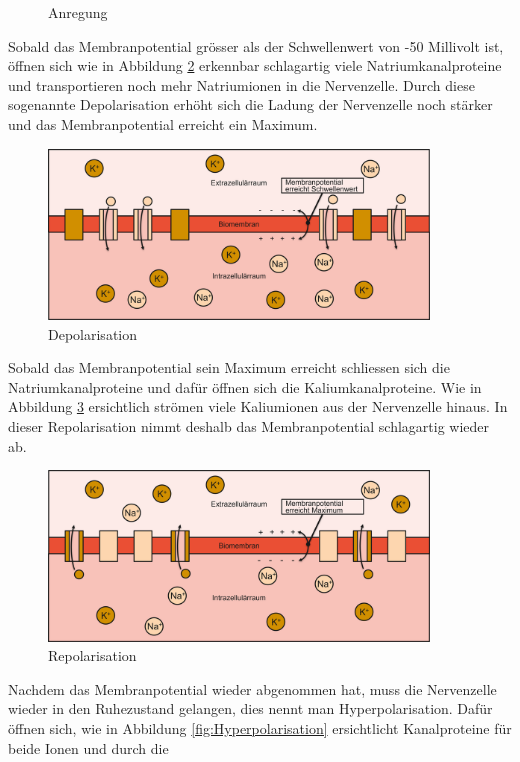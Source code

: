 \begin{refsection}
\begin{figure}[H]
    \caption{Anregung}
    \label{fig:Anregung}
\end{figure}
\noindent
Sobald das Membranpotential grösser als der Schwellenwert von -50 Millivolt ist, öffnen sich wie in Abbildung
\ref{fig:Depolarisation} erkennbar schlagartig viele
Natriumkanalproteine und transportieren noch mehr Natriumionen in die Nervenzelle.
Durch diese sogenannte Depolarisation erhöht sich die Ladung der Nervenzelle noch stärker und das Membranpotential erreicht ein Maximum. 
\begin{figure}[H]
    \centering
    \includegraphics[width=0.9\textwidth]{papers/nerven/Bilder/Vorgang3.png}
    \caption{Depolarisation}
    \label{fig:Depolarisation}
\end{figure}
\noindent
Sobald das Membranpotential sein Maximum erreicht schliessen sich die Natriumkanalproteine und dafür öffnen sich die
Kaliumkanalproteine.
Wie in Abbildung \ref{fig:Repolarisation} ersichtlich strömen viele Kaliumionen aus der Nervenzelle hinaus.
In dieser Repolarisation nimmt deshalb das Membranpotential schlagartig wieder ab.
\begin{figure}[H]
    \centering
    \includegraphics[width=0.9\textwidth]{papers/nerven/Bilder/Vorgang4.png}
    \caption{Repolarisation}
    \label{fig:Repolarisation}
\end{figure}
\noindent
Nachdem das Membranpotential wieder abgenommen hat, muss die Nervenzelle wieder in den Ruhezustand gelangen, dies nennt
man Hyperpolarisation.
Dafür öffnen sich, wie in Abbildung \ref{fig:Hyperpolarisation} ersichtlicht Kanalproteine für beide Ionen und durch die

\end{refsection}
